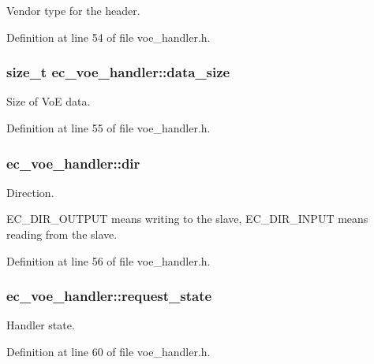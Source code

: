 Vendor type for the header. 



Definition at line 54 of file voe\-\_\-handler.\-h.

\subsubsection[{data\-\_\-size}]{\setlength{\rightskip}{0pt plus 5cm}size\-\_\-t ec\-\_\-voe\-\_\-handler\-::data\-\_\-size}\label{structec__voe__handler_a8f7609a3c03d2eab155ea2d24c4353e2}


Size of Vo\-E data. 



Definition at line 55 of file voe\-\_\-handler.\-h.

\subsubsection[{dir}]{ ec\-\_\-voe\-\_\-handler\-::dir}\label{structec__voe__handler_a4930b843f8706117298fd50362514117}


Direction. 

E\-C\-\_\-\-D\-I\-R\-\_\-\-O\-U\-T\-P\-U\-T means writing to the slave, E\-C\-\_\-\-D\-I\-R\-\_\-\-I\-N\-P\-U\-T means reading from the slave. 

Definition at line 56 of file voe\-\_\-handler.\-h.

\subsubsection[{request\-\_\-state}]{ ec\-\_\-voe\-\_\-handler\-::request\-\_\-state}\label{structec__voe__handler_a08b2653c2e110c29f17b28dce2094c69}


Handler state. 



Definition at line 60 of file voe\-\_\-handler.\-h.

